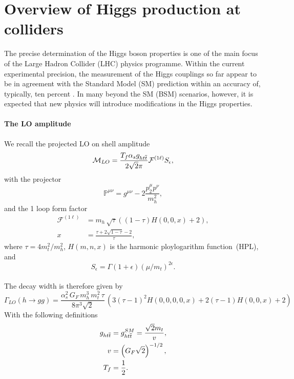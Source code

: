 \chapter{ Overview of Higgs production at colliders }\label{chap:overviewSingleHiggs}
The precise determination of the Higgs boson properties is one of the main focus of the Large Hadron Collider (LHC) physics programme. Within the current experimental precision, the measurement of the Higgs couplings so far appear to be in agreement with the Standard Model (SM) prediction within an accuracy of, typically, ten percent \cite{Aad:2019mbh, Sirunyan:2018koj}. In many beyond the SM (BSM) scenarios, however, it is expected that new physics will introduce modifications in the Higgs properties. 
\subsubsection{The LO amplitude}
We recall the projected LO on shell amplitude~\cite{Gunion:1989we}
\begin{equation}
	\mathcal{M}_{LO} = \frac{ T_f \alpha_s g_{h t \overline t} }{2 \sqrt{2} \pi } \mathcal F^{(1 \ell)}  S_\epsilon ,
\end{equation}
with the projector
\begin{equation}
	\mathbb{P}^{\mu \nu} = g^{\mu \nu}- 2\frac{p^\mu_{2} p^\nu }{m_h^2},
\end{equation}
and the 1 loop form factor
\begin{align}
	\mathcal F^{(1 \ell)} &= m_h\,\sqrt{\tau} \left( (1-\tau) H(0,0,x)+2\right) ,\nonumber  \\
	x &= \frac{\tau+2 \sqrt{1-\tau}-2}{\tau},
	\label{f1l}
\end{align}
where $ \tau = 4 m_t^2/m_h^2$,  $H(m,n,x)$ is the harmonic ploylogarithm function~(HPL), and
\begin{equation}
	S_\epsilon = \Gamma(1+\epsilon) (\mu/m_t)^{2\epsilon}.
\end{equation}
\\
The decay width is therefore given by
\begin{equation}
	\Gamma_{LO}(h\to gg) = \frac{\alpha_s^2\, G_F\,m_h^3 \,m_t^2\,\tau }{8 \pi^3 \sqrt{2}}  \, \left( 3(\tau-1)^2 H(0,0,0,0,x)+2(\tau-1)H(0,0,x)+2\right)
\end{equation}
With the following definitions
\begin{align}
	g_{h t \overline t} &=g_{h t \overline t}^{SM} = {\sqrt{2} m_t \over v}, \nonumber \\
	v &= \left( G_F \sqrt{2}\right) ^{-1/2}, \nonumber \\
	T_f &= \frac{1}{2} .
\end{align}